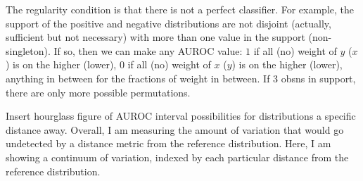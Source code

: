 The regularity condition is that there is not a perfect classifier.
For example, the support of the positive and negative distributions are not disjoint (actually, sufficient but not necessary) with more than one value in the support (non-singleton).
If so, then we can make any AUROC value:
$1$ if all (no) weight of $y$ ($x$) is on the higher (lower),
$0$ if all (no) weight of $x$ ($y$) is on the higher (lower),
anything in between for the fractions of weight in between.
If $3$ obsns in support, there are only more possible permutations.




%
%





{\Large Insert hourglass figure of AUROC interval possibilities for distributions a specific distance away.}
Overall, I am measuring the amount of variation that would go undetected by a distance metric from the reference distribution.
Here, I am showing a continuum of variation, indexed by each particular distance from the reference distribution.




